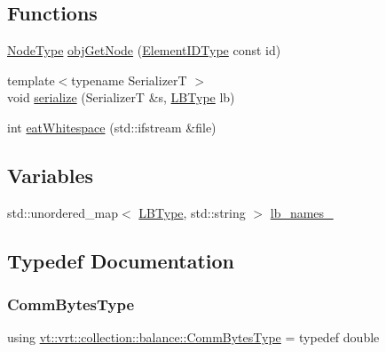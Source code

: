 \subsection*{Functions}
\begin{DoxyCompactItemize}
\item 
\hyperlink{namespacevt_a866da9d0efc19c0a1ce79e9e492f47e2}{Node\+Type} \hyperlink{namespacevt_1_1vrt_1_1collection_1_1balance_af20727e3c42016658b1abf7836ead728}{obj\+Get\+Node} (\hyperlink{namespacevt_1_1vrt_1_1collection_1_1balance_a14c8d2c972f2913aa3f1636e5be0a120}{Element\+I\+D\+Type} const id)
\item 
{\footnotesize template$<$typename SerializerT $>$ }\\void \hyperlink{namespacevt_1_1vrt_1_1collection_1_1balance_a783d95de203cabd0f599440e9869c313}{serialize} (SerializerT \&s, \hyperlink{namespacevt_1_1vrt_1_1collection_1_1balance_ac4f99693509affcc67db182d4aad9b5c}{L\+B\+Type} lb)
\item 
int \hyperlink{namespacevt_1_1vrt_1_1collection_1_1balance_a605ea184edf7f99b0022f960f71bf4d4}{eat\+Whitespace} (std\+::ifstream \&file)
\end{DoxyCompactItemize}
\subsection*{Variables}
\begin{DoxyCompactItemize}
\item 
std\+::unordered\+\_\+map$<$ \hyperlink{namespacevt_1_1vrt_1_1collection_1_1balance_ac4f99693509affcc67db182d4aad9b5c}{L\+B\+Type}, std\+::string $>$ \hyperlink{namespacevt_1_1vrt_1_1collection_1_1balance_a25f2d26f8832c24be922ebbb2cd7c119}{lb\+\_\+names\+\_\+}
\end{DoxyCompactItemize}


\subsection{Typedef Documentation}
\mbox{\label{namespacevt_1_1vrt_1_1collection_1_1balance_a0772d7dd137393e9874b9f8caa96d420}} 
\subsubsection{\texorpdfstring{Comm\+Bytes\+Type}{CommBytesType}}
{\footnotesize\ttfamily using \hyperlink{namespacevt_1_1vrt_1_1collection_1_1balance_a0772d7dd137393e9874b9f8caa96d420}{vt\+::vrt\+::collection\+::balance\+::\+Comm\+Bytes\+Type} = typedef double}

